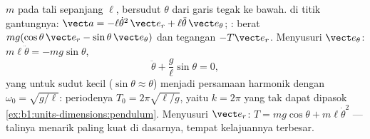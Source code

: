 \begin{example}\label{ex:b1:newton-dynamics:pendulum}
 $m$ pada tali sepanjang $\ell$, bersudut $\theta$ dari garis tegak
ke bawah.  di titik gantungnya: $\vect a =
-\ell\dot\theta^2\,\vect e_r + \ell\ddot\theta\,\vect e_\theta$;
: berat $mg(\cos\theta\,\vect e_r - \sin\theta\,\vect e_\theta)$
dan tegangan $-T\vect e_r$. Menyusuri $\vect e_\theta$: $m\ell\ddot\theta =
-mg\sin\theta$,
\[
\ddot\theta + \frac{g}{\ell}\sin\theta = 0 ,
\]
yang untuk sudut kecil ($\sin\theta \approx \theta$) menjadi persamaan
harmonik dengan $\omega_0 = \sqrt{g/\ell}$: periodenya
$T_0 = 2\pi\sqrt{\ell/g}$, yaitu $k = 2\pi$ yang tak dapat dipasok
\cref{ex:b1:units-dimensions:pendulum}. Menyusuri $\vect e_r$:
$T = mg\cos\theta + m\ell\dot\theta^2$ --- talinya menarik paling kuat
di dasarnya, tempat kelajuannya terbesar.
\end{example}

